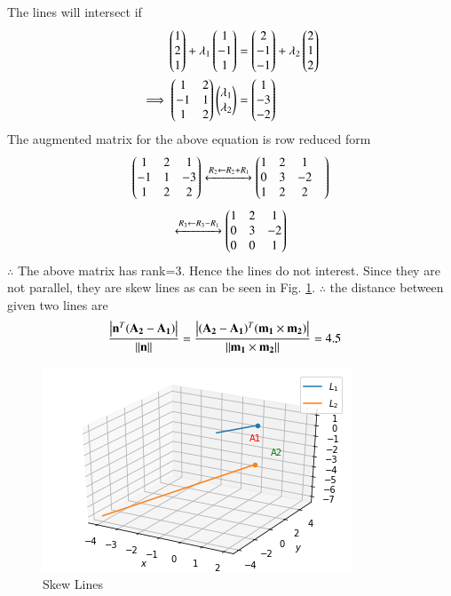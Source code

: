 The lines will intersect if 
\begin{align}
\begin{pmatrix}1 \\ 2 \\ 1\end{pmatrix} + \lambda_1\begin{pmatrix}1 \\ -1 \\ 1\end{pmatrix} &= \begin{pmatrix}2 \\ -1 \\ -1\end{pmatrix} + \lambda_2\begin{pmatrix}2 \\ 1 \\ 2\end{pmatrix}
\\
\implies \begin{pmatrix}1 & 2\\ -1 & 1 \\ 1 & 2\end{pmatrix}\begin{pmatrix}\lambda_1 \\ \lambda_2\end{pmatrix} &= \begin{pmatrix}1 \\ -3  \\ -2 \end{pmatrix}
\end{align}
The augmented matrix for the above equation is row reduced form
\begin{align}
\begin{pmatrix}1 & 2 & 1\\-1 & 1 & -3 \\ 1 & 2 & 2\end{pmatrix} 
\xleftrightarrow {R_2\leftarrow R_2 +R_1}\begin{pmatrix}1 & 2 & 1 & \\0 & 3 & -2 \\1 & 2 & 2 \end{pmatrix}
\end{align}
\begin{align}
\xleftrightarrow {R_3\leftarrow R_3 - R_1}\begin{pmatrix}1 & 2 & 1 \\ 0 & 3 & -2 \\ 0 & 0 & 1\end{pmatrix}
\end{align}
$\therefore$ The above matrix has rank=3. Hence the lines do not interest. Since they are not parallel, they are skew lines as can be
seen in Fig. \ref{linform/32/fig: Skew Lines}.	
$\therefore$ the distance between given two lines are
\begin{align}
\frac{\left\vert\mathbf{n}^T(\mathbf{A_2}-\mathbf{A_1})\right\vert}{\left\lVert\mathbf{n}\right\rVert} = \frac{\left\vert(\mathbf{A_2}-\mathbf{A_1})^T(\mathbf{m_1} \times \mathbf{ m_2})\right\vert}{\left\lVert\mathbf{m_1} \times \mathbf{m_2}\right\rVert}
&=4.5
\end{align}
%
\begin{figure}[!ht]
\centering
\includegraphics[width=\columnwidth]{solutions/su2021/2/32/download (7).png}
\caption{Skew Lines}
\label{linform/32/fig: Skew Lines}	
\end{figure}
